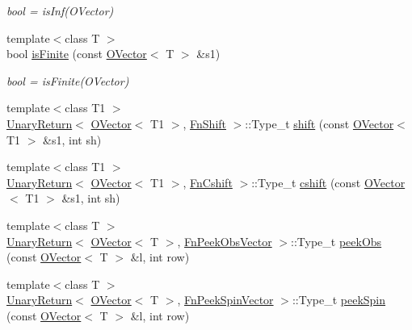 \begin{DoxyCompactItemize}
\begin{DoxyCompactList}\small\item\em bool = is\+Inf(\+O\+Vector) \end{DoxyCompactList}\item 
{\footnotesize template$<$class T $>$ }\\bool \mbox{\hyperlink{group__obsvector_ga4955ee051f997aca2666a9361dcb7861}{is\+Finite}} (const \mbox{\hyperlink{classENSEM_1_1OVector}{O\+Vector}}$<$ T $>$ \&s1)
\begin{DoxyCompactList}\small\item\em bool = is\+Finite(\+O\+Vector) \end{DoxyCompactList}\item 
{\footnotesize template$<$class T1 $>$ }\\\mbox{\hyperlink{structENSEM_1_1UnaryReturn}{Unary\+Return}}$<$ \mbox{\hyperlink{classENSEM_1_1OVector}{O\+Vector}}$<$ T1 $>$, \mbox{\hyperlink{structENSEM_1_1FnShift}{Fn\+Shift}} $>$\+::Type\+\_\+t \mbox{\hyperlink{group__obsvector_ga0f56d530ee90cdb061c1aeff65389a61}{shift}} (const \mbox{\hyperlink{classENSEM_1_1OVector}{O\+Vector}}$<$ T1 $>$ \&s1, int sh)
\item 
{\footnotesize template$<$class T1 $>$ }\\\mbox{\hyperlink{structENSEM_1_1UnaryReturn}{Unary\+Return}}$<$ \mbox{\hyperlink{classENSEM_1_1OVector}{O\+Vector}}$<$ T1 $>$, \mbox{\hyperlink{structENSEM_1_1FnCshift}{Fn\+Cshift}} $>$\+::Type\+\_\+t \mbox{\hyperlink{group__obsvector_ga62bf87c2f25855df9774ccd89281b555}{cshift}} (const \mbox{\hyperlink{classENSEM_1_1OVector}{O\+Vector}}$<$ T1 $>$ \&s1, int sh)
\item 
{\footnotesize template$<$class T $>$ }\\\mbox{\hyperlink{structENSEM_1_1UnaryReturn}{Unary\+Return}}$<$ \mbox{\hyperlink{classENSEM_1_1OVector}{O\+Vector}}$<$ T $>$, \mbox{\hyperlink{structENSEM_1_1FnPeekObsVector}{Fn\+Peek\+Obs\+Vector}} $>$\+::Type\+\_\+t \mbox{\hyperlink{group__obsvector_ga8d085844df795594177550f3748fb6a5}{peek\+Obs}} (const \mbox{\hyperlink{classENSEM_1_1OVector}{O\+Vector}}$<$ T $>$ \&l, int row)
\item 
{\footnotesize template$<$class T $>$ }\\\mbox{\hyperlink{structENSEM_1_1UnaryReturn}{Unary\+Return}}$<$ \mbox{\hyperlink{classENSEM_1_1OVector}{O\+Vector}}$<$ T $>$, \mbox{\hyperlink{structENSEM_1_1FnPeekSpinVector}{Fn\+Peek\+Spin\+Vector}} $>$\+::Type\+\_\+t \mbox{\hyperlink{group__obsvector_ga53ddc54421a1f3fa7ee2ed55f15627a6}{peek\+Spin}} (const \mbox{\hyperlink{classENSEM_1_1OVector}{O\+Vector}}$<$ T $>$ \&l, int row)

\end{DoxyCompactItemize}
